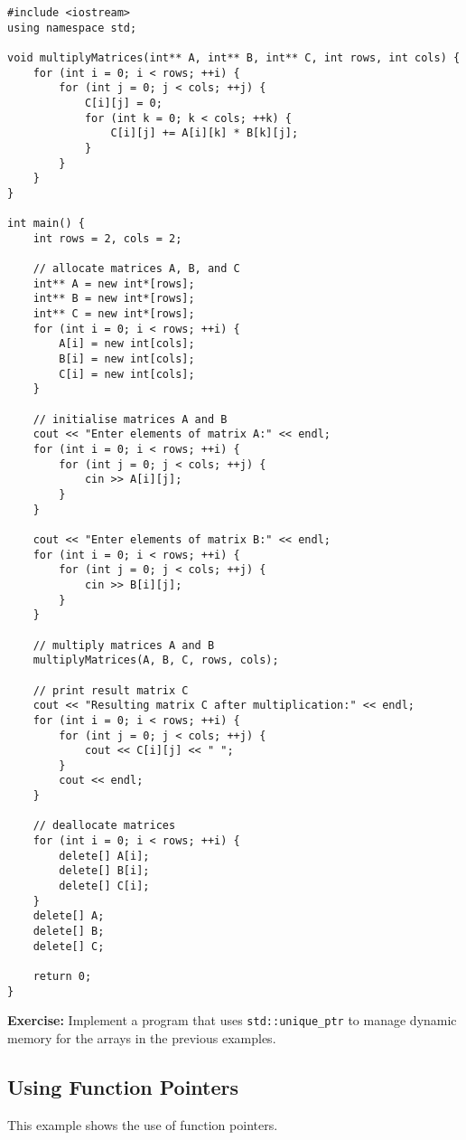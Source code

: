 \documentclass{article}
\begin{document}
\begin{verbatim}
#include <iostream>
using namespace std;

void multiplyMatrices(int** A, int** B, int** C, int rows, int cols) {
    for (int i = 0; i < rows; ++i) {
        for (int j = 0; j < cols; ++j) {
            C[i][j] = 0;
            for (int k = 0; k < cols; ++k) {
                C[i][j] += A[i][k] * B[k][j];
            }
        }
    }
}

int main() {
    int rows = 2, cols = 2;

    // allocate matrices A, B, and C
    int** A = new int*[rows];
    int** B = new int*[rows];
    int** C = new int*[rows];
    for (int i = 0; i < rows; ++i) {
        A[i] = new int[cols];
        B[i] = new int[cols];
        C[i] = new int[cols];
    }

    // initialise matrices A and B
    cout << "Enter elements of matrix A:" << endl;
    for (int i = 0; i < rows; ++i) {
        for (int j = 0; j < cols; ++j) {
            cin >> A[i][j];
        }
    }

    cout << "Enter elements of matrix B:" << endl;
    for (int i = 0; i < rows; ++i) {
        for (int j = 0; j < cols; ++j) {
            cin >> B[i][j];
        }
    }

    // multiply matrices A and B
    multiplyMatrices(A, B, C, rows, cols);

    // print result matrix C
    cout << "Resulting matrix C after multiplication:" << endl;
    for (int i = 0; i < rows; ++i) {
        for (int j = 0; j < cols; ++j) {
            cout << C[i][j] << " ";
        }
        cout << endl;
    }

    // deallocate matrices
    for (int i = 0; i < rows; ++i) {
        delete[] A[i];
        delete[] B[i];
        delete[] C[i];
    }
    delete[] A;
    delete[] B;
    delete[] C;

    return 0;
}
\end{verbatim}

\textbf{Exercise:} Implement a program that uses \texttt{std::unique\_ptr} to manage dynamic memory for the arrays in the previous examples.

\subsection*{Using Function Pointers}
This example shows the use of function pointers.
\end{document}
